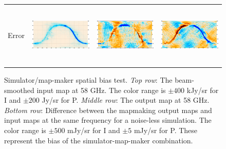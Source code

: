 \documentclass{article}
\begin{document}
\begin{figure}
\begin{tabular}{rm{56mm}m{54.4mm}m{56mm}}
		Error &
		\includegraphics[height=29.7mm,clip,trim=0 0 7.5mm 0]{plots/std_sb_diff_0.png} &
		\includegraphics[height=29.7mm,clip,trim=7.5mm 0 7.5mm 0]{plots/std_sb_diff_1.png} &
		\includegraphics[height=29.7mm,clip,trim=7.5mm 0 0 0]{plots/std_sb_diff_2.png}
	\end{tabular}
	\caption{Simulator/map-maker spatial bias test.
		\emph{Top row}: The beam-smoothed input map at 58 GHz.
			The color range is $\pm 400$ kJy/sr for I and $\pm 200$ Jy/sr for P.
		\emph{Middle row}: The output map at 58 GHz.
		\emph{Bottom row}: Difference between the mapmaking output maps and
			input maps at the same frequency for a noise-less simulation.
			The color range is $\pm 500$ mJy/sr for I and $\pm 5$ mJy/sr for P.
			These represent the bias of the simulator-map-maker combination.}
	\label{fig:spatbias}
\end{figure}
\end{document}
